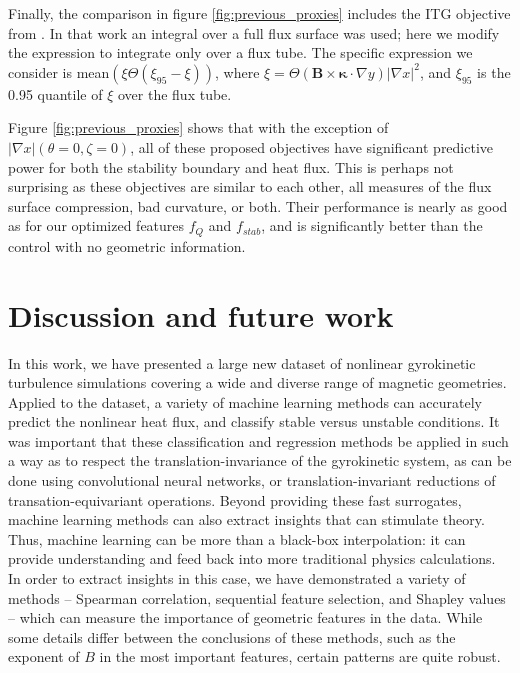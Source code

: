 \documentclass{jpp}
\begin{document}
Finally, the comparison in figure \ref{fig:previous_proxies} includes the ITG objective from \cite{goodman2024quasi}.
In that work an integral over a full flux surface was used; here we modify the expression to integrate only over a flux tube.
The specific expression we consider is mean$(\xi \Theta(\xi_{95} - \xi))$, where $\xi = \Theta(\mathbf{B}\times\mathbf{\kappa}\cdot\nabla y)|\nabla x|^2$, and $\xi_{95}$ is the 0.95 quantile of $\xi$ over the flux tube.

Figure \ref{fig:previous_proxies} shows that with the exception of $|\nabla x|(\theta=0,\zeta=0)$, all of these proposed objectives have significant predictive power for both the stability boundary and heat flux.
This is perhaps not surprising as these objectives are similar to each other, all measures of the flux surface compression, bad curvature, or both.
Their performance is nearly as good as for our optimized features $f_Q$ and $f_{stab}$, and is significantly better than the control with no geometric information.



\section{Discussion and future work}
\label{sec:conclusions}

In this work, we have presented a large new dataset of nonlinear gyrokinetic turbulence simulations covering a wide and diverse range of magnetic geometries.
Applied to the dataset, a variety of machine learning methods can accurately predict the nonlinear heat flux, and classify stable versus unstable conditions.
It was important that these classification and regression methods be applied in such a way as to respect the translation-invariance of the gyrokinetic system, as can be done using convolutional neural networks, or translation-invariant reductions of transation-equivariant operations.
Beyond providing these fast surrogates, machine learning methods can also extract insights that can stimulate theory.
Thus, machine learning can be more than a black-box interpolation: it can provide understanding and feed back into more traditional physics calculations.
In order to extract insights in this case, we have demonstrated a variety of methods -- Spearman correlation, sequential feature selection, and Shapley values -- which can measure the importance of geometric features in the data.
While some details differ between the conclusions of these methods, such as the exponent of $B$ in the most important features, certain patterns are quite robust.
\end{document}
